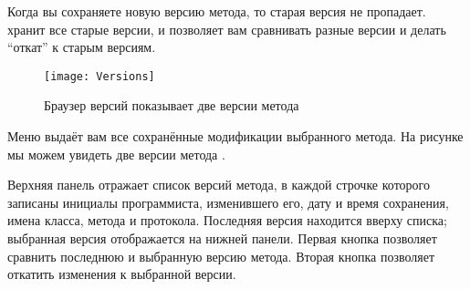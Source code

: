 \documentclass[a4paper,10pt,twoside]{book}
\begin{document}
Когда вы сохраняете новую версию метода, то старая версия не пропадает.  \pharo хранит все старые версии, и позволяет вам сравнивать разные версии и делать ``откат'' к старым версиям.

\begin{figure}[btp]
   \centering
   \texttt{[image: Versions]}
   \caption{Браузер версий показывает две версии метода }
\end{figure}


Меню  выдаёт вам все сохранённые модификации выбранного метода. На рисунке  мы можем увидеть две версии метода .


Верхняя панель отражает список версий метода, в каждой строчке которого записаны инициалы программиста, изменившего его, дату и время сохранения, имена класса, метода и протокола. Последняя версия находится вверху списка; выбранная версия отображается на нижней панели. Первая кнопка позволяет сравнить последнюю и выбранную версию метода. Вторая кнопка позволяет откатить изменения к выбранной версии.

\end{document}

